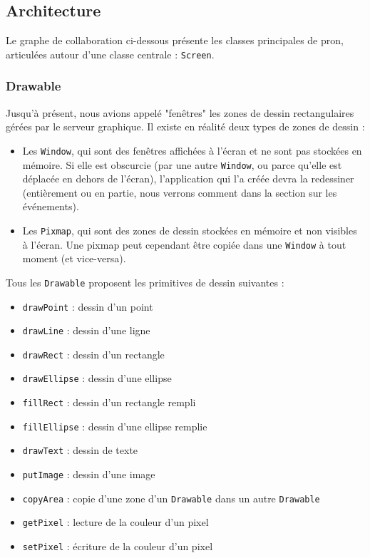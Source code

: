 \subsection{Architecture}

Le graphe de collaboration ci-dessous présente les classes principales de pron, articulées autour d'une classe centrale : \verb|Screen|.

\subsubsection{Drawable}

Jusqu'à présent, nous avions appelé "fenêtres" les zones de dessin rectangulaires gérées par le serveur graphique. Il existe en réalité deux types de zones de dessin :
\begin{itemize}
  \item Les \verb|Window|, qui sont des fenêtres affichées à l'écran et ne sont pas stockées en mémoire. Si elle est obscurcie (par une autre \verb|Window|, ou parce qu'elle est déplacée en dehors de l'écran), l'application qui l'a créée devra la redessiner (entièrement ou en partie, nous verrons comment dans la section sur les événements).
  \item Les \verb|Pixmap|, qui sont des zones de dessin stockées en mémoire et non visibles à l'écran. Une pixmap peut cependant être copiée dans une \verb|Window| à tout moment (et vice-versa).
\end{itemize}

\vspace{1em}

Tous les \verb|Drawable| proposent les primitives de dessin suivantes :
\begin{itemize}
  \item \verb|drawPoint| : dessin d'un point
  \item \verb|drawLine| : dessin d'une ligne
  \item \verb|drawRect| : dessin d'un rectangle
  \item \verb|drawEllipse| : dessin d'une ellipse
  \item \verb|fillRect| : dessin d'un rectangle rempli
  \item \verb|fillEllipse| : dessin d'une ellipse remplie
  \item \verb|drawText| : dessin de texte
  \item \verb|putImage| : dessin d'une image
  \item \verb|copyArea| : copie d'une zone d'un \verb|Drawable| dans un autre \verb|Drawable|
  \item \verb|getPixel| : lecture de la couleur d'un pixel
  \item \verb|setPixel| : écriture de la couleur d'un pixel
\end{itemize}

